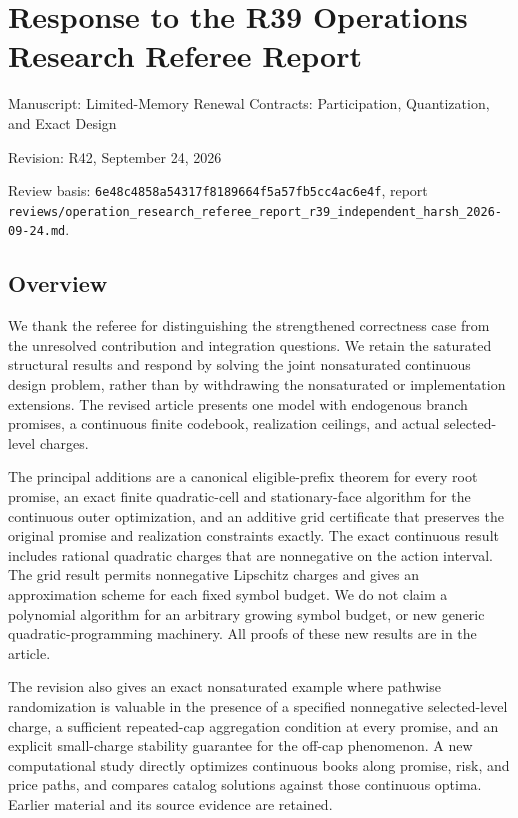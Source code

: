 \documentclass[11pt,letterpaper]{article}
\begin{document}
\section*{Response to the R39 Operations Research Referee Report}


Manuscript: Limited-Memory Renewal Contracts: Participation, Quantization, and Exact Design



Revision: R42, September 24, 2026



Review basis: \nolinkurl{6e48c4858a54317f8189664f5a57fb5cc4ac6e4f}, report \nolinkurl{reviews/operation_research_referee_report_r39_independent_harsh_2026-09-24.md}.



\subsection*{Overview}


We thank the referee for distinguishing the strengthened correctness case from the unresolved contribution and integration questions. We retain the saturated structural results and respond by solving the joint nonsaturated continuous design problem, rather than by withdrawing the nonsaturated or implementation extensions. The revised article presents one model with endogenous branch promises, a continuous finite codebook, realization ceilings, and actual selected-level charges.



The principal additions are a canonical eligible-prefix theorem for every root promise, an exact finite quadratic-cell and stationary-face algorithm for the continuous outer optimization, and an additive grid certificate that preserves the original promise and realization constraints exactly. The exact continuous result includes rational quadratic charges that are nonnegative on the action interval. The grid result permits nonnegative Lipschitz charges and gives an approximation scheme for each fixed symbol budget. We do not claim a polynomial algorithm for an arbitrary growing symbol budget, or new generic quadratic-programming machinery. All proofs of these new results are in the article.



The revision also gives an exact nonsaturated example where pathwise randomization is valuable in the presence of a specified nonnegative selected-level charge, a sufficient repeated-cap aggregation condition at every promise, and an explicit small-charge stability guarantee for the off-cap phenomenon. A new computational study directly optimizes continuous books along promise, risk, and price paths, and compares catalog solutions against those continuous optima. Earlier material and its source evidence are retained.
\end{document}
